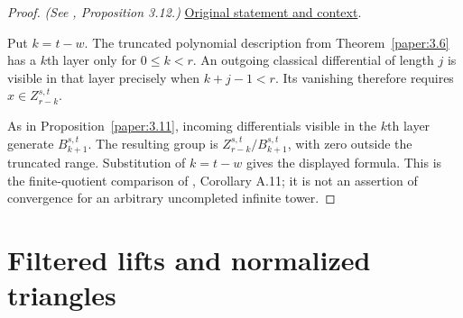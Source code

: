 \begin{proof}
\textit{(See \cite{LWX126}, Proposition 3.12.)} \href{paper/main.tex.html#L849}{Original statement and context}.

Put $k=t-w$. The truncated polynomial description from Theorem~\ref{paper:3.6} has a $k$th layer only for $0\le k<r$. An outgoing classical differential of length $j$ is visible in that layer precisely when $k+j-1<r$. Its vanishing therefore requires $x\in Z_{r-k}^{s,t}$.

As in Proposition~\ref{paper:3.11}, incoming differentials visible in the $k$th layer generate $B_{k+1}^{s,t}$. The resulting group is $Z_{r-k}^{s,t}/B_{k+1}^{s,t}$, with zero outside the truncated range. Substitution of $k=t-w$ gives the displayed formula. This is the finite-quotient comparison of \cite{BHS}, Corollary A.11; it is not an assertion of convergence for an arbitrary uncompleted infinite tower.
\end{proof}

\section{Filtered lifts and normalized triangles}

